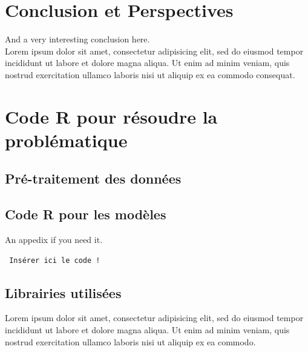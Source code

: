 \documentclass[a4paper, oneside, 12pt, final]{extreport}
\begin{document}
\chapter*{Conclusion et Perspectives}
\label{chap:conclusion}
%
  And a very interesting conclusion here\@. ~\\
  Lorem ipsum dolor sit amet, consectetur adipisicing elit, sed do eiusmod
  tempor incididunt ut labore et dolore magna aliqua. Ut enim ad minim veniam,
  quis nostrud exercitation ullamco laboris nisi ut aliquip ex ea commodo
  consequat.

\newpage
\appendix
{}

\chapter{Code R pour résoudre la problématique}
\label{chap:appendix}


\section{Pré-traitement des données}
\section{Code R pour les modèles}

 An appedix if you need it.
 
 \begin{verbatim}
 Insérer ici le code !
 \end{verbatim}

\section{Librairies utilisées}
 
  Lorem ipsum dolor sit amet, consectetur adipisicing elit, sed do eiusmod
  tempor incididunt ut labore et dolore magna aliqua. Ut enim ad minim veniam,
  quis nostrud exercitation ullamco laboris nisi ut aliquip ex ea commodo.


\nocite{*}

\end{document}
